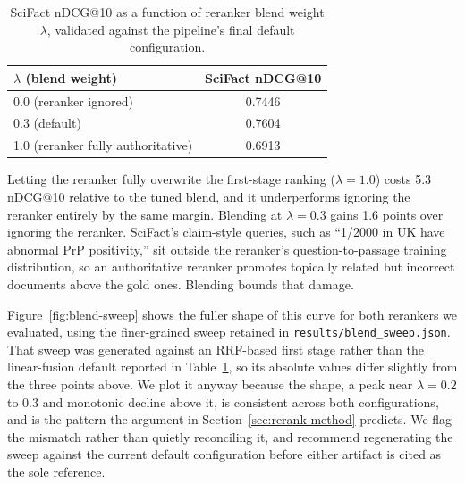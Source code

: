 \documentclass[11pt]{article}
\begin{document}
\begin{table}[h]
\centering
\caption{SciFact nDCG@10 as a function of reranker blend weight $\lambda$, validated against the pipeline's final default configuration.}
\label{tab:blend-sweep}
\begin{tabular}{lc}
\toprule
$\lambda$ (blend weight) & SciFact nDCG@10 \\
\midrule
0.0 (reranker ignored) & 0.7446 \\
0.3 (default) & 0.7604 \\
1.0 (reranker fully authoritative) & 0.6913 \\
\bottomrule
\end{tabular}
\end{table}

Letting the reranker fully overwrite the first-stage ranking ($\lambda=1.0$) costs 5.3 nDCG@10 relative to the tuned blend, and it underperforms ignoring the reranker entirely by the same margin. Blending at $\lambda=0.3$ gains 1.6 points over ignoring the reranker. SciFact's claim-style queries, such as ``1/2000 in UK have abnormal PrP positivity,'' sit outside the reranker's question-to-passage training distribution, so an authoritative reranker promotes topically related but incorrect documents above the gold ones. Blending bounds that damage.

Figure~\ref{fig:blend-sweep} shows the fuller shape of this curve for both rerankers we evaluated, using the finer-grained sweep retained in \texttt{results/blend\_sweep.json}. That sweep was generated against an RRF-based first stage rather than the linear-fusion default reported in Table~\ref{tab:blend-sweep}, so its absolute values differ slightly from the three points above. We plot it anyway because the shape, a peak near $\lambda=0.2$ to $0.3$ and monotonic decline above it, is consistent across both configurations, and is the pattern the argument in Section~\ref{sec:rerank-method} predicts. We flag the mismatch rather than quietly reconciling it, and recommend regenerating the sweep against the current default configuration before either artifact is cited as the sole reference.
\end{document}
